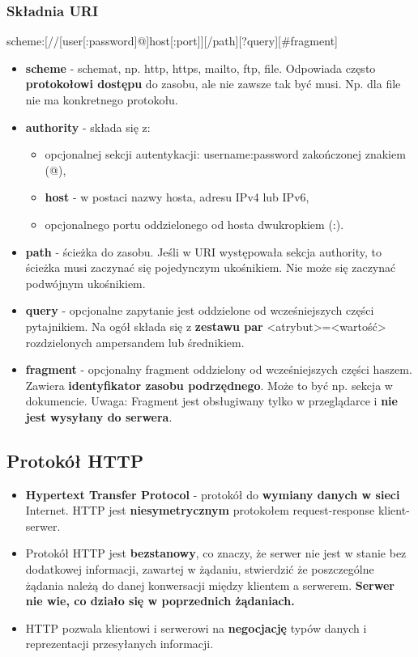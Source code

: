 \documentclass[../main.tex]{subfiles}
\begin{document}
    \subsubsection{Składnia URI}
    \begin{lcverbatim}
        scheme:[//[user[:password]@]host[:port]][/path][?query][#fragment]
    \end{lcverbatim}
    \begin{itemize}
        \item \textbf{scheme} - schemat, np. http, https, mailto, ftp, file. Odpowiada często \textbf{protokołowi dostępu} do zasobu, ale nie zawsze tak być musi. Np. dla file nie ma konkretnego protokołu.
        \item \textbf{authority} - składa się z:
        \begin{itemize}
            \item opcjonalnej sekcji autentykacji: username:password zakończonej znakiem (@),
            \item \textbf{host} - w postaci nazwy hosta, adresu IPv4 lub IPv6,
            \item opcjonalnego portu oddzielonego od hosta dwukropkiem (:).
        \end{itemize}
        \item \textbf{path} - ścieżka do zasobu. Jeśli w URI występowała sekcja authority, to ścieżka musi zaczynać się pojedynczym ukośnikiem. Nie może się zaczynać podwójnym ukośnikiem.
        \item \textbf{query} - opcjonalne zapytanie jest oddzielone od wcześniejszych części pytajnikiem. Na ogół składa się z \textbf{zestawu par} <atrybut>=<wartość> rozdzielonych ampersandem lub średnikiem.
        \item \textbf{fragment} - opcjonalny fragment oddzielony od wcześniejszych części haszem. Zawiera \textbf{identyfikator zasobu podrzędnego}. Może to być np. sekcja w dokumencie. Uwaga: Fragment jest obsługiwany tylko w przeglądarce i \textbf{nie jest wysyłany do serwera}.
    \end{itemize}

    \subsection{Protokół HTTP}
    \begin{itemize}
        \item \textbf{Hypertext Transfer Protocol} - protokół do \textbf{wymiany danych w sieci} Internet. HTTP jest \textbf{niesymetrycznym} protokołem request-response klient-serwer.
        \item Protokół HTTP jest \textbf{bezstanowy}, co znaczy, że serwer nie jest w stanie bez dodatkowej informacji, zawartej w żądaniu, stwierdzić że poszczególne żądania należą do danej konwersacji między klientem a serwerem. \textbf{Serwer nie wie, co działo się w poprzednich żądaniach.}
        \item HTTP pozwala klientowi i serwerowi na \textbf{negocjację} typów danych i reprezentacji przesyłanych informacji.
    \end{itemize}
\end{document}
